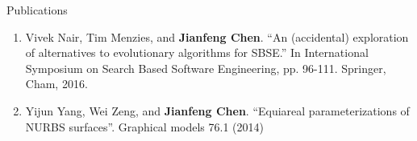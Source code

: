 \documentclass{resume} %
\begin{document}
\begin{rSection}{ Publications}
\begin{enumerate}[wide, labelwidth=!, labelindent=0pt]
\item Vivek Nair, Tim Menzies, and \textbf{Jianfeng Chen}. ``An (accidental) exploration of alternatives to evolutionary algorithms for SBSE.'' In International Symposium on Search Based Software Engineering, pp. 96-111. Springer, Cham, 2016.
\item Yijun Yang, Wei Zeng, and \textbf{Jianfeng Chen}. ``Equiareal parameterizations of NURBS surfaces''. Graphical models 76.1 (2014)

\end{enumerate}
\end{rSection}
\end{document}
